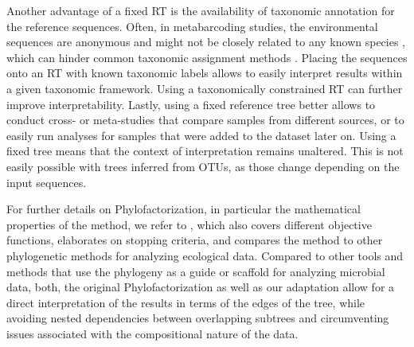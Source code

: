 Another advantage of a fixed \ac{RT} is the availability of taxonomic annotation for the reference sequences.
Often, in metabarcoding studies, the environmental sequences are anonymous
and might not be closely related to any known species \cite{Karsenti2011,Sunagawa2015,Mahe2017},
which can hinder common taxonomic assignment methods \cite{Koski2001}.
Placing the sequences onto an \ac{RT} with known taxonomic labels %
allows to easily interpret results within a given taxonomic framework.
Using a taxonomically constrained \ac{RT} can further improve interpretability.
Lastly, using a fixed reference tree better allows to conduct cross- or meta-studies
that compare samples from different sources, or to easily run analyses for samples that were added to the dataset later on.
Using a fixed tree means that the context of interpretation remains unaltered.
This is not easily possible with trees inferred from OTUs, as those change depending on the input sequences.

For further details on Phylofactorization, in particular the mathematical properties of the method,
we refer to ,
which also covers different objective functions, elaborates on stopping criteria,
and compares the method to other phylogenetic methods for analyzing ecological data.
Compared to other tools and methods that use the phylogeny as a guide or scaffold for analyzing microbial data,
both, the original Phylofactorization as well as our adaptation allow for a direct interpretation of the results
in terms of the edges of the tree, while avoiding nested dependencies between overlapping subtrees
and circumventing issues associated with the compositional nature of the data.


